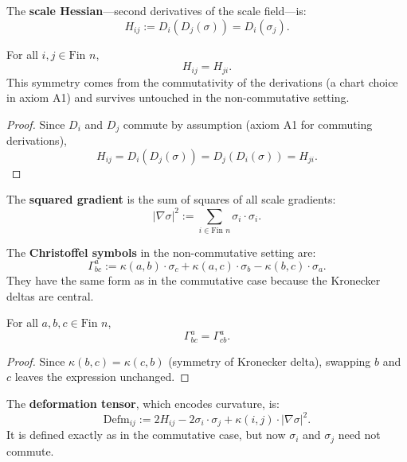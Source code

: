 \begin{definition}
The \textbf{scale Hessian}—second derivatives of the scale field—is:
\[
H_{ij} := D_i(D_j(\sigma)) = D_i(\sigma_j) .
\]
\end{definition}

\begin{theorem}
For all $i, j \in \text{Fin } n$,
\[
H_{ij} = H_{ji} .
\]
This symmetry comes from the commutativity of the derivations (a chart choice in axiom A1) and survives untouched in the non-commutative setting.
\begin{proof}
Since $D_i$ and $D_j$ commute by assumption (axiom A1 for commuting derivations),
\[
H_{ij} = D_i(D_j(\sigma)) = D_j(D_i(\sigma)) = H_{ji} .
\]
\end{proof}
\end{theorem}

\begin{definition}
The \textbf{squared gradient} is the sum of squares of all scale gradients:
\[
|\nabla \sigma|^2 := \sum_{i \in \text{Fin } n} \sigma_i \cdot \sigma_i .
\]
\end{definition}

\begin{definition}
The \textbf{Christoffel symbols} in the non-commutative setting are:
\[
\Gamma^a_{bc} := \kappa(a,b) \cdot \sigma_c + \kappa(a,c) \cdot \sigma_b - \kappa(b,c) \cdot \sigma_a .
\]
They have the same form as in the commutative case because the Kronecker deltas are central.
\end{definition}

\begin{theorem}
For all $a, b, c \in \text{Fin } n$,
\[
\Gamma^a_{bc} = \Gamma^a_{cb} .
\]
\begin{proof}
Since $\kappa(b,c) = \kappa(c,b)$ (symmetry of Kronecker delta), swapping $b$ and $c$ leaves the expression unchanged.
\end{proof}
\end{theorem}

\begin{definition}
The \textbf{deformation tensor}, which encodes curvature, is:
\[
\text{Defm}_{ij} := 2 H_{ij} - 2 \sigma_i \cdot \sigma_j + \kappa(i,j) \cdot |\nabla \sigma|^2 .
\]
It is defined exactly as in the commutative case, but now $\sigma_i$ and $\sigma_j$ need not commute.
\end{definition}

